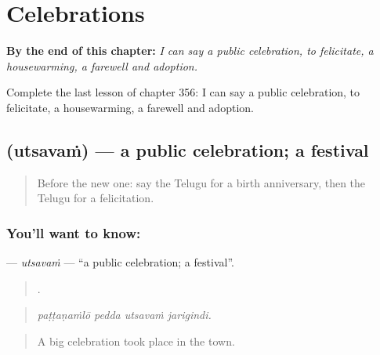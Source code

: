 
\chapter{Celebrations}
\label{ch:te-celebrations}

\begin{chapteropening}
\textbf{By the end of this chapter:} \emph{I can say a public celebration, to felicitate, a housewarming, a farewell and adoption.}

Complete the last lesson of chapter 356: I can say a public celebration, to felicitate, a housewarming, a farewell and adoption.
\end{chapteropening}

\section[\texorpdfstring{\te{ఉత్సవం} (utsavaṁ)}{ఉత్సవం (utsavaṁ)}]{ (utsavaṁ) — a public celebration; a festival}

\label{lesson:TE-C356-utsavam}



\begin{quote}
Before the new one: say the Telugu for a birth anniversary, then the Telugu for a felicitation.
\end{quote}

\subsection*{You'll want to know: }
\textbf{} — \emph{utsavaṁ} — \textquotedblleft{}a public celebration; a festival\textquotedblright{}.

\begin{quote}
   .
\end{quote}

\begin{quote}
\emph{paṭṭaṇaṁlō pedda utsavaṁ jarigindi.}
\end{quote}

\begin{quote}
A big celebration took place in the town.
\end{quote}


